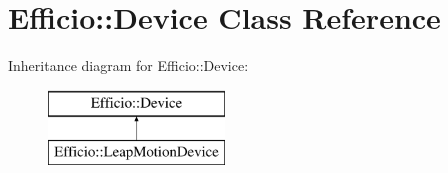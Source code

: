\hypertarget{class_efficio_1_1_device}{}\section{Efficio\+:\+:Device Class Reference}
\label{class_efficio_1_1_device}
Inheritance diagram for Efficio\+:\+:Device\+:\begin{figure}[H]
\begin{center}
\leavevmode
\includegraphics[height=2.000000cm]{class_efficio_1_1_device}
\end{center}
\end{figure}
